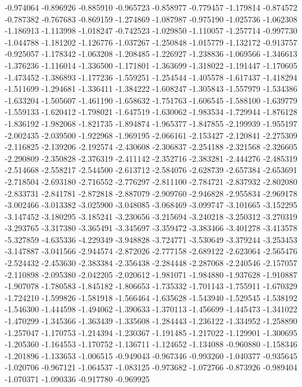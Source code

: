 -0.974064
-0.896926
-0.885910
-0.965723
-0.858977
-0.779457
-1.179814
-0.874572
-0.787382
-0.767683
-0.869159
-1.274869
-1.087987
-0.975190
-1.025736
-1.062308
-1.186913
-1.113998
-1.018247
-0.742523
-1.029850
-1.110057
-1.257714
-0.997730
-1.044788
-1.181202
-1.126776
-1.037267
-1.250848
-1.015779
-1.132172
-0.913757
-0.925057
-1.178342
-1.063208
-1.208485
-1.226927
-1.238836
-1.069566
-1.346613
-1.376236
-1.116014
-1.336500
-1.171801
-1.363699
-1.318022
-1.191447
-1.170605
-1.473452
-1.386893
-1.177236
-1.559251
-1.254544
-1.405578
-1.617437
-1.418294
-1.511699
-1.294681
-1.336411
-1.384222
-1.608247
-1.305843
-1.557979
-1.534386
-1.633204
-1.505607
-1.461190
-1.658632
-1.751763
-1.606545
-1.588100
-1.639779
-1.559133
-1.620412
-1.798021
-1.647519
-1.630062
-1.983534
-1.729944
-1.876128
-1.836192
-1.982068
-1.821735
-1.894874
-1.965377
-1.847855
-2.199939
-1.955197
-2.002435
-2.039500
-1.922968
-1.969195
-2.066161
-2.153427
-2.120841
-2.275309
-2.116825
-2.139206
-2.192574
-2.430608
-2.306837
-2.254188
-2.321568
-2.326605
-2.290809
-2.350828
-2.376319
-2.411142
-2.352716
-2.383281
-2.444276
-2.485319
-2.514668
-2.558217
-2.544500
-2.613712
-2.584076
-2.628739
-2.657384
-2.653691
-2.718504
-2.693180
-2.716552
-2.776297
-2.811100
-2.784721
-2.837932
-2.802080
-2.833731
-2.841781
-2.872818
-2.887079
-2.909760
-2.946828
-2.955834
-2.969178
-3.002466
-3.013382
-3.025900
-3.048085
-3.068469
-3.099747
-3.101665
-3.152295
-3.147452
-3.180295
-3.185241
-3.230656
-3.215694
-3.240218
-3.250312
-3.270319
-3.293765
-3.317380
-3.365491
-3.345697
-3.359472
-3.383466
-3.401278
-3.413578
-5.327859
-4.635336
-4.229349
-3.948828
-3.724771
-3.530649
-3.379244
-3.253453
-3.147887
-3.041566
-2.944574
-2.872026
-2.777158
-2.689122
-2.623064
-2.565476
-2.524432
-2.453630
-2.383384
-2.356438
-2.284448
-2.287068
-2.240546
-2.157057
-2.110898
-2.095380
-2.042205
-2.020612
-1.981071
-1.984880
-1.937628
-1.910887
-1.907078
-1.780583
-1.845182
-1.806653
-1.735332
-1.701143
-1.755911
-1.670329
-1.724210
-1.599826
-1.581918
-1.566464
-1.635628
-1.543940
-1.529545
-1.538192
-1.546300
-1.444598
-1.494062
-1.390633
-1.370113
-1.456699
-1.445473
-1.341022
-1.470299
-1.345366
-1.363439
-1.335608
-1.284443
-1.236122
-1.334952
-1.258890
-1.257047
-1.170753
-1.214394
-1.230367
-1.191485
-1.217022
-1.129901
-1.300695
-1.205360
-1.164553
-1.170752
-1.136711
-1.124652
-1.134088
-0.960880
-1.158346
-1.201896
-1.133653
-1.006515
-0.949043
-0.967346
-0.993260
-1.040377
-0.935645
-1.020706
-0.967121
-1.064537
-1.083125
-0.973682
-1.072766
-0.873926
-0.989404
-1.070371
-1.090336
-0.917780
-0.969925
